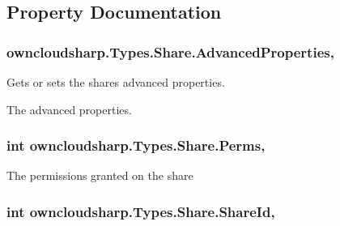 \subsection{Property Documentation}
\hypertarget{classowncloudsharp_1_1_types_1_1_share_aeaf2ca3c390ed01433320f86deb53ca5}{}
\subsubsection[{Advanced\+Properties}]{ owncloudsharp.\+Types.\+Share.\+Advanced\+Properties\hspace{0.3cm}{\ttfamily [get]}, {\ttfamily [set]}}\label{classowncloudsharp_1_1_types_1_1_share_aeaf2ca3c390ed01433320f86deb53ca5}


Gets or sets the shares advanced properties. 

The advanced properties.\hypertarget{classowncloudsharp_1_1_types_1_1_share_a9d6c9011eaba3aa723444e01969bc9b8}{}
\subsubsection[{Perms}]{\setlength{\rightskip}{0pt plus 5cm}int owncloudsharp.\+Types.\+Share.\+Perms\hspace{0.3cm}{\ttfamily [get]}, {\ttfamily [set]}}\label{classowncloudsharp_1_1_types_1_1_share_a9d6c9011eaba3aa723444e01969bc9b8}


The permissions granted on the share 

\hypertarget{classowncloudsharp_1_1_types_1_1_share_ada18f7c002805affd1fb26d1a11ea7a9}{}
\subsubsection[{Share\+Id}]{\setlength{\rightskip}{0pt plus 5cm}int owncloudsharp.\+Types.\+Share.\+Share\+Id\hspace{0.3cm}{\ttfamily [get]}, {\ttfamily [set]}}\label{classowncloudsharp_1_1_types_1_1_share_ada18f7c002805affd1fb26d1a11ea7a9}


